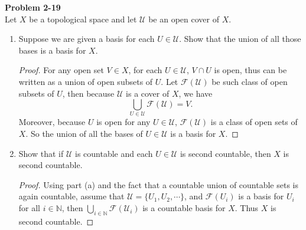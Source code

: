 \documentclass[12pt, a4paper]{article}
\theoremstyle{plain}
\newcommand{\N}{\mathbb{N}}
\newcommand{\U}{\mathscr{U}}
\newcommand{\F}{\mathcal{F}}
\newenvironment{problem}[2][Problem]
    { \begin{mdframed}[backgroundcolor=gray!20] \textbf{#1 #2} \\}
    {  \end{mdframed}}
\begin{document}
\begin{problem}{2-19}
Let $X$ be a topological space and let $\U$ be an open cover of $X$.
\begin{enumerate}[label=(\alph*)]
\item Suppose we are given a basis for each $U\in\U$. Show that the union of all those bases is a basis for $X$.
	\begin{proof}
	For any open set $V\in X$, for each $U\in\U$, $V\cap U$ is open, thus can be written as a union of open subsets of $U$. Let $\F(\U)$ be such class of open subsets of $U$, then because $\U$ is a cover of $X$, we have
	\[
	\bigcup_{U\in\U}{\F(\U)}=V.
	\]
	Moreover, because $U$ is open for any $U\in\U$, $\F(\U)$ is a class of open sets of $X$. So the union of all the bases of $U\in\U$ is a basis for $X$.
	\end{proof}
\item Show that if $\U$ is countable and each $U\in\U$ is second countable, then $X$ is second countable.
	\begin{proof}
	Using part (a) and the fact that a countable union of countable sets is again countable, assume that $\U=\{U_1,U_2,\cdots\}$, and $\F(U_i)$ is a basis for $U_i$ for all $i\in\N$, then $\bigcup_{i\in\N}\F(\U_i)$ is a countable basis for $X$. Thus $X$ is second countable.
	\end{proof}
\end{enumerate}
\end{problem}

\pagebreak
\end{document}
